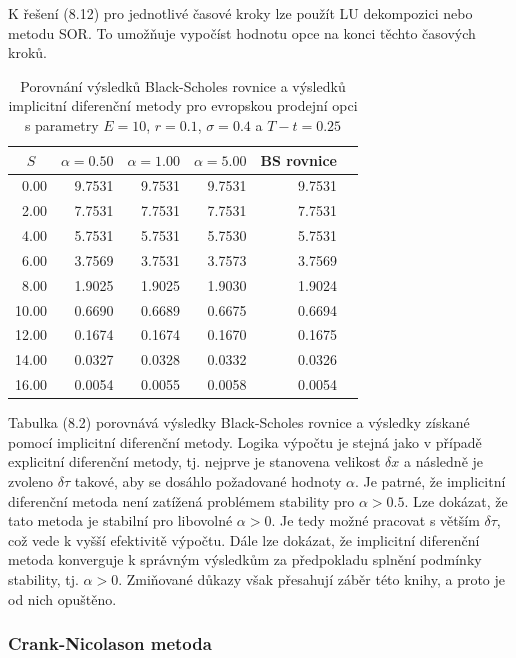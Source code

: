 \documentclass[a4paper]{book}
\begin{document}
K řešení (8.12) pro jednotlivé časové kroky lze použít LU dekompozici nebo metodu SOR. To umožňuje vypočíst hodnotu opce na konci těchto časových kroků.
\begin{table}
\begin{center}
\begin{tabular}{r r r r r r}
\multicolumn {1}{c}{$S$} &
\multicolumn {1}{c}{$\alpha = 0.50$} &
\multicolumn {1}{c}{$\alpha = 1.00$} &
\multicolumn {1}{c}{$\alpha = 5.00$} &
\multicolumn {1}{c}{BS rovnice} \\
\hline
 0.00 & 9.7531 & 9.7531 & 9.7531 & 9.7531 \\
 2.00 & 7.7531 & 7.7531 & 7.7531 & 7.7531 \\
 4.00 & 5.7531 & 5.7531 & 5.7530 & 5.7531 \\
 6.00 & 3.7569 & 3.7531 & 3.7573 & 3.7569 \\
 8.00 & 1.9025 & 1.9025 & 1.9030 & 1.9024 \\
10.00 & 0.6690 & 0.6689 & 0.6675 & 0.6694 \\
12.00 & 0.1674 & 0.1674 & 0.1670 & 0.1675 \\
14.00 & 0.0327 & 0.0328 & 0.0332 & 0.0326 \\
16.00 & 0.0054 & 0.0055 & 0.0058 & 0.0054 \\
\hline
\end{tabular}
\end{center}
\caption{Porovnání výsledků Black-Scholes rovnice a výsledků implicitní diferenční metody pro evropskou prodejní opci s parametry $E=10$, $r=0.1$, $\sigma = 0.4$ a $T - t = 0.25$}
\end{table}

Tabulka (8.2) porovnává výsledky Black-Scholes rovnice a výsledky získané pomocí implicitní diferenční metody. Logika výpočtu je stejná jako v případě explicitní diferenční metody, tj. nejprve je stanovena velikost $\delta x$ a následně je zvoleno $\delta \tau$ takové, aby se dosáhlo požadované hodnoty $\alpha$. Je patrné, že implicitní diferenční metoda není zatížená problémem stability pro $\alpha > 0.5$. Lze dokázat, že tato metoda je stabilní pro libovolné $\alpha > 0$. Je tedy možné pracovat s větším $\delta \tau$, což vede k vyšší efektivitě výpočtu. Dále lze dokázat, že implicitní diferenční metoda konverguje k správným výsledkům za předpokladu splnění podmínky stability, tj. $\alpha > 0$. Zmiňované důkazy však přesahují záběr této knihy, a proto je od nich opuštěno.

\subsubsection{Crank-Nicolason metoda}
\end{document}
